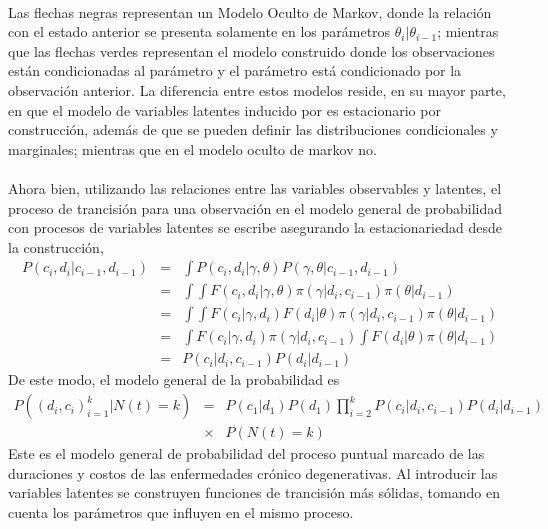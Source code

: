 \\
Las flechas negras representan un Modelo Oculto de Markov, donde la relaci\'on con el estado anterior se presenta solamente en los par\'ametros $\theta_i|\theta_{i-1}$; mientras que las flechas verdes representan el modelo construido donde los observaciones est\'an condicionadas al par\'ametro y el par\'ametro est\'a condicionado por la observaci\'on anterior. La diferencia entre estos modelos reside, en su mayor parte, en que el modelo de variables latentes inducido por \cite{pitt2002constructing} es estacionario por construcci\'on, adem\'as de que se pueden definir las distribuciones condicionales y marginales; mientras que en el modelo oculto de markov no.\\
\\
Ahora bien, utilizando las relaciones entre las variables observables y latentes, el proceso de trancisi\'on para una observaci\'on en el modelo general de probabilidad con procesos de variables latentes se escribe asegurando la estacionariedad desde la construcci\'on,
\begin{eqnarray*}
P(c_i,d_i|c_{i-1},d_{i-1}) &=&\int P(c_i,d_i|\gamma,\theta)P(\gamma,\theta|c_{i-1},d_{i-1})\\
&=&\int \int F(c_i,d_i|\gamma,\theta)\pi(\gamma|d_i,c_{i-1})\pi(\theta|d_{i-1})\\
&=&\int \int F(c_i|\gamma,d_i) F(d_i|\theta)\pi(\gamma|d_i,c_{i-1})\pi(\theta|d_{i-1})\\
&=&\int F(c_i|\gamma,d_i)\pi(\gamma|d_i,c_{i-1}) \int F(d_i|\theta)\pi(\theta|d_{i-1})\\
&=&P(c_i|d_i,c_{i-1})P(d_i|d_{i-1})
\end{eqnarray*}
De este modo, el modelo general de la probabilidad es
\begin{eqnarray*}
P((d_i,c_i)_{i=1}^k|N(t)=k)&=& P(c_1|d_1)P(d_1) \prod_{i=2}^k P(c_i|d_i,c_{i-1})P(d_i|d_{i-1})\\
&\times & P(N(t)=k)%
\end{eqnarray*}
Este es el modelo general de probabilidad del proceso puntual marcado de las duraciones y costos de las enfermedades cr\'onico degenerativas. Al introducir las variables latentes se construyen funciones de trancisi\'on m\'as s\'olidas, tomando en cuenta los par\'ametros que influyen en el mismo proceso.\\
